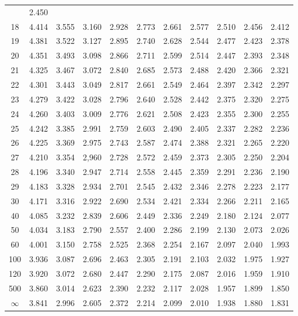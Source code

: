 \documentclass[12pt]{article}
\begin{document}
\begin{table}
\begin{center}
{\begin{tabular}{|c|c|c|c|c|c|c|c|c|c|c|}
 &2.450\\
 18& 4.414& 3.555& 3.160 &2.928 &  2.773 &2.661 &2.577 &2.510 &2.456& 2.412\\
  19 &4.381 &3.522 &3.127& 2.895 &2.740 &2.628 &2.544 &2.477 &2.423 &2.378\\
   20& 4.351&3.493 &3.098 &2.866 &2.711 &  2.599 &  2.514 &2.447 &2.393& 2.348\\
    21& 4.325& 3.467& 3.072& 2.840 &  2.685 &  2.573& 2.488& 2.420& 2.366& 2.321\\
     22& 4.301& 3.443& 3.049& 2.817 &2.661 &2.549 &  2.464 &2.397& 2.342& 2.297\\
      23& 4.279 &3.422& 3.028& 2.796& 2.640 &  2.528 &2.442 &2.375 &2.320 &2.275 \\
      24 &4.260 &3.403 &3.009 &2.776 &2.621 &  2.508 &  2.423 &2.355& 2.300& 2.255\\
       25& 4.242 &3.385 &2.991 &2.759 &  2.603  & 2.490 &2.405 &2.337 &2.282 &2.236\\
        26 &4.225 &3.369 &2.975 &2.743&   2.587 &2.474& 2.388 &2.321 &2.265& 2.220 \\
        27 &4.210 &3.354 &2,960 &2.728 &2.572 &2.459 &2.373 &2.305 &2.250 &2.204\\
         28 &4.196 &3.340& 2.947 &2.714 &2.558 &2.445 &2.359 &2.291 &2.236 &2.190\\
          29 &4.183& 3.328 &2.934 &2.701 &2.545 &2.432 &2.346 &2.278 &2.223 &2.177\\
           30 &4.171 &3.316 &2.922 &2.690 &2.534 &2.421 &2.334 &  2.266& 2.211 &2.165\\
            40 &4.085 &3.232 &2.839 &2.606 &2.449 &2.336 &2.249 &  2.180 & 2.124 &2.077\\
             50 &4.034 &3.183& 2.790& 2.557 &2.400 &2.286 &2.199 &2.130 &2.073 &2.026 \\
             60 &4.001& 3.150 &2.758 &2.525 &2.368 &2.254 &2.167 &2.097 &2.040 &1.993\\
              100& 3.936& 3.087 &2.696 &2.463 &2.305 &2.191 &2.103 &2.032 &1.975 &1.927\\
               120& 3.920 &3.072& 2.680& 2.447 &2.290 &2.175 &2.087 &2.016& 1.959 &  1.910\\
500& 3.860 &3.014 &2.623 &2.390 &2.232& 2.117 &2.028 &1.957& 1.899& 1.850\\ \hline
                 $\infty$ & 3.841& 2.996 &2.605 &2.372 &2.214 &2.099 &2.010 &1.938 &1.880
                 &1.831\\
  \hline
\end{tabular}
}
\end{center}
\end{table}
\end{document}
